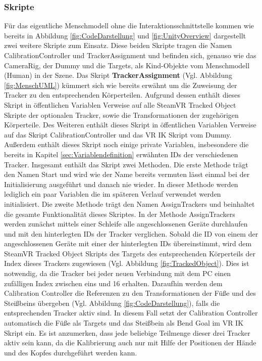 \subsubsection{Skripte}\label{sec:MMCode}
Für das eigentliche Menschmodell ohne die Interaktionsschnittstelle kommen wie bereits in Abbildung \ref{fig:CodeDarstellung}  und \ref{fig:UnityOverview} dargestellt zwei weitere Skripte zum Einsatz. Diese beiden Skripte tragen die Namen CalibrationController und TrackerAssignment und befinden sich, genauso wie das CameraRig, der Dummy und die Targets, als Kind-Objekte vom Menschmodell (Human) in der Szene.
\newline\newline
Das Skript \textbf{TrackerAssignment} (Vgl. Abbildung \ref{fig:MenschUML}) kümmert sich wie bereits erwähnt um die Zuweisung der Tracker zu den entsprechenden Körperteilen. Aufgrund dessen enthält dieses Skript in öffentlichen Variablen Verweise auf alle SteamVR Tracked Object Skripte der optionalen Tracker, sowie die Transformationen der zugehörigen Körperteile. Des Weiteren enthält dieses Skript in öffentlichen Variablen Verweise auf das Skript CalibrationController und das VR IK Skript vom Dummy. Außerdem enthält dieses Skript noch einige private Variablen, insbesondere die bereits in Kapitel \ref{sec:Variablendefinition} erwähnten IDs der verschiedenen Tracker.
\newline
Insgesamt enthält das Skript zwei Methoden. Die erste Methode trägt den Namen Start und wird wie der Name bereits vermuten lässt einmal bei der Initialisierung ausgeführt und danach nie wieder. In dieser Methode werden lediglich ein paar Variablen die im späteren Verlauf verwendet werden initialisiert. Die zweite Methode trägt den Namen AssignTrackers und beinhaltet die gesamte Funktionalität dieses Skriptes.
In der Methode AssignTrackers werden zunächst mittels einer Schleife alle angeschlossenen Geräte durchlaufen und mit den hinterlegten IDs der Tracker verglichen. Sobald die ID von einem der angeschlossenen Geräte mit einer der hinterlegten IDs übereinstimmt, wird dem SteamVR Tracked Object Skripts des Targets des entsprechenden Körperteils der Index dieses Trackers zugewiesen (Vgl. Abbildung \ref{fig:TrackedObject}). Dies ist notwendig, da die Tracker bei jeder neuen Verbindung mit dem PC einen zufälligen Index zwischen eins und 16 erhalten.
Daraufhin werden dem Calibration Controller die Referenzen zu den Transformationen der Füße und des Steißbeins übergeben (Vgl. Abbildung \ref{fig:CodeDarstellung}), falls die entsprechenden Tracker aktiv sind. In diesem Fall setzt der Calibration Controller automatisch die Füße als Targets und das Steißbein als Bend Goal im VR IK Skript ein. Es ist anzumerken, dass jede beliebige Teilmenge dieser drei Tracker aktiv sein kann, da die Kalibrierung auch nur mit Hilfe der Positionen der Hände und des Kopfes durchgeführt werden kann.

